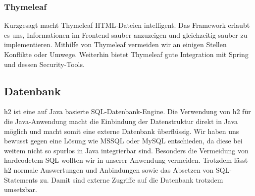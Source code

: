 \subsubsection*{Thymeleaf}
Kurzgesagt macht Thymeleaf HTML-Dateien intelligent. Das Framework erlaubt es uns, Informationen im Frontend sauber anzuzeigen und gleichzeitig sauber zu implementieren. Mithilfe von Thymeleaf vermeiden wir an einigen Stellen Konflikte oder Umwege. Weiterhin bietet Thymeleaf gute Integration mit Spring und dessen Security-Tools.

\subsection{Datenbank}
h2 ist eine auf Java basierte SQL-Datenbank-Engine. Die Verwendung von h2 für die Java-Anwendung macht die Einbindung der Datenstruktur direkt in Java möglich und macht somit eine externe Datenbank überflüssig. Wir haben uns bewusst gegen eine Lösung wie MSSQL oder MySQL entschieden, da diese bei weitem nicht so spurlos in Java integrierbar sind. Besonders die Vermeidung von hardcodetem SQL wollten wir in unserer Anwendung vermeiden. Trotzdem lässt h2 normale Auswertungen und Anbindungen sowie das Absetzen von SQL-Statements zu. Damit sind externe Zugriffe auf die Datenbank trotzdem umsetzbar.
%
%
